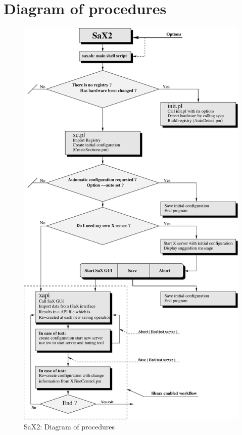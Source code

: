 \section{Diagram of procedures}
\begin{figure}[h]
\centering
\includegraphics[scale=0.42]{figures/cheme.eps}
\caption{SaX2: Diagram of procedures}
\end{figure}
